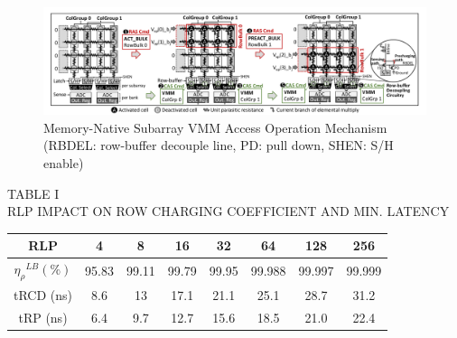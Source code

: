 \documentclass{article}
\begin{document}
\begin{itemize}
 				\begin{figure}[h]
 					\centering
 					\includegraphics[width=0.7\linewidth]{images/fig6}
 					\caption{Memory-Native Subarray VMM Access Operation Mechanism (RBDEL: row-buffer decouple line, PD: pull down, SHEN: S/H enable)}
 					\label{fig:fig6}
 				\end{figure}
 				
 				\begin{center}
 					TABLE I \\
 					RLP IMPACT ON ROW CHARGING COEFFICIENT AND MIN. LATENCY
 					\begin{tabular}{|c|c|c|c|c|c|c|c|} \hline
 						RLP & 4 & 8 & 16 & 32 & 64 & 128 & 256 \\ \hline
 						${\eta_{\rho}}^{\textit{LB}} (\%)$ & 95.83 & 99.11 & 99.79 & 99.95 & 99.988 & 99.997 & 99.999 \\ \hline
 						tRCD (ns) & 8.6 & 13 & 17.1 & 21.1 & 25.1 & 28.7 & 31.2 \\ \hline
 						tRP (ns) & 6.4 & 9.7 & 12.7 & 15.6 & 18.5 & 21.0 & 22.4 \\ \hline
 					\end{tabular}
 				\end{center}	
 		\end{itemize}
 		
\end{document}
